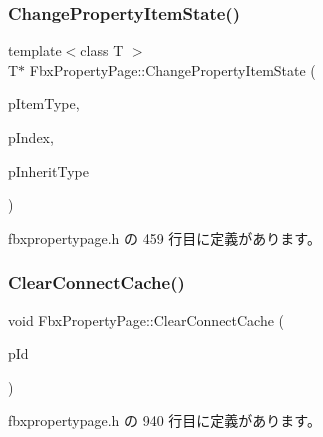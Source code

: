 \subsubsection{\texorpdfstring{Change\+Property\+Item\+State()}{ChangePropertyItemState()}}
{\footnotesize\ttfamily template$<$class T $>$ \\
T$\ast$ Fbx\+Property\+Page\+::\+Change\+Property\+Item\+State (\begin{DoxyParamCaption}\item[{const T $\ast$}]{p\+Item\+Type,  }\item[{\hyperlink{fbxtypes_8h_a088fa96de3b0b3ea69f0f6afef525dfb}{Fbx\+Int}}]{p\+Index,  }\item[{\hyperlink{class_fbx_property_flags_ae3b667a4fcac4b827fa186a698fec2f8}{Fbx\+Property\+Flags\+::\+E\+Inherit\+Type}}]{p\+Inherit\+Type }\end{DoxyParamCaption})\hspace{0.3cm}{\ttfamily [inline]}}



 fbxpropertypage.\+h の 459 行目に定義があります。

\mbox{\label{class_fbx_property_page_a782f081a93c92aa0005d5b96c4ee04e8}} 
\subsubsection{\texorpdfstring{Clear\+Connect\+Cache()}{ClearConnectCache()}}
{\footnotesize\ttfamily void Fbx\+Property\+Page\+::\+Clear\+Connect\+Cache (\begin{DoxyParamCaption}\item[{\hyperlink{fbxtypes_8h_a088fa96de3b0b3ea69f0f6afef525dfb}{Fbx\+Int}}]{p\+Id }\end{DoxyParamCaption})\hspace{0.3cm}{\ttfamily [inline]}}



 fbxpropertypage.\+h の 940 行目に定義があります。

\mbox{\label{class_fbx_property_page_a5ca4dcb646f9d547db779965dca6bd65}} 
